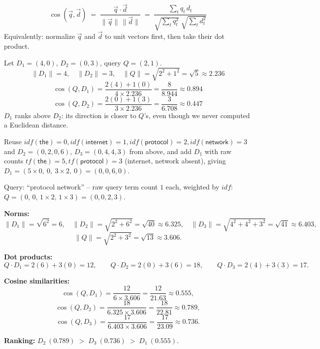 \documentclass[11pt, a4paper]{article}
\begin{document}
\begin{formulabox}
\[
\cos(\vec q, \vec d) \;=\; \frac{\vec q \cdot \vec d}{\lVert \vec q\rVert\,\lVert \vec d\rVert} \;=\; \frac{\sum_{t} q_t\, d_t}{\sqrt{\sum_t q_t^2}\;\sqrt{\sum_t d_t^2}}
\]
Equivalently: normalize $\vec q$ and $\vec d$ to unit vectors first, then take their dot product.
\end{formulabox}

\begin{examplebox}
Let $D_1=(4,0)$, $D_2=(0,3)$, query $Q=(2,1)$.
\[
\lVert D_1\rVert = 4, \quad \lVert D_2\rVert = 3, \quad \lVert Q\rVert = \sqrt{2^2+1^2}=\sqrt5 \approx 2.236
\]
\[
\cos(Q,D_1) = \frac{2(4)+1(0)}{4\times2.236} = \frac{8}{8.944} \approx 0.894
\]
\[
\cos(Q,D_2) = \frac{2(0)+1(3)}{3\times2.236} = \frac{3}{6.708} \approx 0.447
\]
$D_1$ ranks above $D_2$: its direction is closer to $Q$'s, even though we never computed a Euclidean distance.
\end{examplebox}

\begin{examplebox}
Reuse $idf(\textsf{the})=0, idf(\textsf{internet})=1, idf(\textsf{protocol})=2, idf(\textsf{network})=3$ and $D_2=(0,2,0,6)$, $D_3=(0,4,4,3)$ from above, and add $D_1$ with raw counts $tf(\textsf{the})=5,tf(\textsf{protocol})=3$ (internet, network absent), giving $D_1 = (5\times0,\ 0,\ 3\times2,\ 0) = (0,0,6,0)$.

Query: ``\textsf{protocol network}'' -- raw query term count $1$ each, weighted by $idf$: $Q = (0,\,0,\,1\times2,\,1\times3) = (0,0,2,3)$.

\textbf{Norms:}
\[
\lVert D_1\rVert=\sqrt{6^2}=6,\quad \lVert D_2\rVert=\sqrt{2^2+6^2}=\sqrt{40}\approx6.325,\quad \lVert D_3\rVert=\sqrt{4^2+4^2+3^2}=\sqrt{41}\approx6.403,
\]
\[
\lVert Q\rVert = \sqrt{2^2+3^2}=\sqrt{13}\approx3.606.
\]

\textbf{Dot products:}
\[
Q\cdot D_1 = 2(6)+3(0)=12, \qquad Q\cdot D_2 = 2(0)+3(6)=18, \qquad Q\cdot D_3 = 2(4)+3(3)=17.
\]

\textbf{Cosine similarities:}
\[
\cos(Q,D_1)=\frac{12}{6\times3.606}=\frac{12}{21.63}\approx0.555,
\]
\[
\cos(Q,D_2)=\frac{18}{6.325\times3.606}=\frac{18}{22.81}\approx0.789,
\]
\[
\cos(Q,D_3)=\frac{17}{6.403\times3.606}=\frac{17}{23.09}\approx0.736.
\]

\textbf{Ranking:} $D_2\ (0.789) \;>\; D_3\ (0.736) \;>\; D_1\ (0.555)$.
\end{examplebox}
\end{document}
